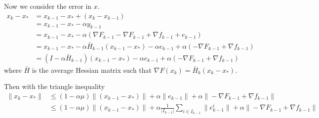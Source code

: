 \documentclass[11pt]{article}
\begin{document}
	\bigskip

	\bigskip

	\noindent 

	Now we consider the error in $x$.
	 \begin{align*}
	  x_k-x_\ast &= x_{k-1}-x_\ast + (x_k-x_{k-1})\\
	  &=x_{k-1}-x_\ast -\alpha y_{k-1}\\
	  &=x_{k-1}-x_\ast -\alpha (\nabla F_{k-1}-\nabla F_{k-1}+\nabla f_{k-1} + e_{k-1})\\
	  &=x_{k-1}-x_\ast -\alpha\bar H_{k-1}(x_{k-1}-x_\ast) -\alpha e_{k-1} +\alpha (-\nabla F_{k-1}+\nabla f_{k-1})\\
	  &=(I-\alpha\bar H_{k-1})(x_{k-1}-x_\ast) -\alpha e_{k-1} +\alpha (-\nabla F_{k-1}+\nabla f_{k-1}) 
	 \end{align*}
	 where $\bar{H}$ is the average Hessian matrix such that  $\nabla F(x_k) = \bar H_k(x_k-x_\ast)$.

	Then with the triangle inequality
	\begin{align*}
	\| x_k-x_\ast \| &\leq (1-\alpha \mu)\|(x_{k-1}-x_\ast)\| +\alpha \|e_{k-1}\| + \alpha \|-\nabla F_{k-1}+\nabla f_{k-1} \| \\
	&\leq (1-\alpha \mu)\|(x_{k-1}-x_\ast)\| +\alpha  \frac{1}{|I_{k-1}|} \sum_{i\in I_{k-1}}{\|e_{k-1}^i\| }+ \alpha \|-\nabla F_{k-1}+\nabla f_{k-1} \|
	\end{align*}
\end{document}
